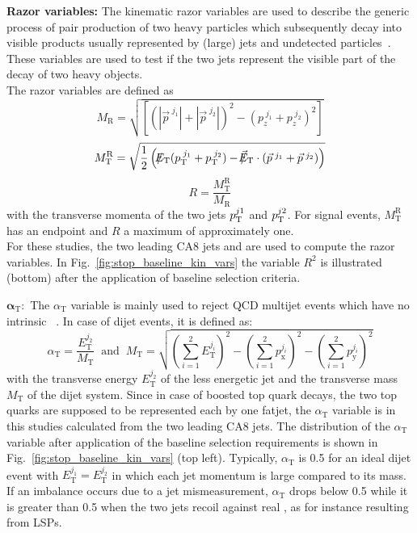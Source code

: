 \begin{description}
 \item \textbf{Razor variables:} The kinematic razor variables are used to describe the generic process of pair production of two heavy particles which subsequently decay into visible products usually represented by (large) jets and undetected particles~\cite{Chatrchyan:2012uea, Chatrchyan:2014goa, CMS-PAS-SUS-14-011}. These variables are used to test if the two jets represent the visible part of the decay of two heavy objects. \\
The razor variables are defined as
\begin{equation}
M_\mathrm{R} = \sqrt{\left[(|\vec{p}^{\; j_1} | + |\vec{p}^{\; j_2} |)^2 - (p_z^{\; j_1}  + p_z^{\; j_2} )^2 \right]}
\end{equation}
 \begin{equation}
M_\mathrm{T}^\mathrm{R} = \sqrt{\frac{1}{2} \left( \slash\mkern-12mu{E}_{\text{T}} (p_{\text{T}}^{\; j_1}  + p_{\text{T}}^{\; j_2} ) - \slash\mkern-12mu{\vec{E}}_{\text{T}} \cdot (\vec{p}^{\; j_1} + \vec{p}^{\; j_2}) \right) }
\end{equation}
\begin{equation}
R = \frac{M_\mathrm{T}^\mathrm{R}}{M_\mathrm{R}}
\end{equation}
with the transverse momenta of the two jets $p_{\text{T}}^{j1}$ and $p_{\text{T}}^{j2}$. For signal events, $M_\mathrm{T}^\mathrm{R}$ has an endpoint and $R$ a maximum of approximately one. \\
For these studies, the two leading CA8 jets and \met are used to compute the razor variables. In Fig.~\ref{fig:stop_baseline_kin_vars} the variable $R^2$ is illustrated (bottom) after the application of baseline selection criteria. 
\item $\mathbf{\alpha_\mathrm{T}:}$ The $\alpha_\mathrm{T}$ variable is mainly used to reject QCD multijet events which have no intrinsic \met~\cite{Chatrchyan:2012wa, Chatrchyan:2013lya}. In case of dijet events, it is defined as:
\begin{equation}
 \alpha_\mathrm{T} = \frac{E_\mathrm{T}^{j_2}}{M_\mathrm{T}} \;\; \mathrm{and} \;\; M_\mathrm{T} = \sqrt{\left( \sum_{i=1}^{2} E_\mathrm{T}^{j_i} \right)^2 - \left( \sum_{i=1}^{2} p_\mathrm{x}^{j_i} \right)^2 - \left( \sum_{i=1}^{2} p_\mathrm{y}^{j_i} \right)^2}
\end{equation}
with the transverse energy $E_\mathrm{T}^{j_2}$ of the less energetic jet and the transverse mass $M_\mathrm{T}$ of the dijet system. Since in case of boosted top quark decays, the two top quarks are supposed to be represented each by one fatjet, the $\alpha_\mathrm{T}$ variable is in this studies calculated from the two leading CA8 jets. The distribution of the $\alpha_\mathrm{T}$ variable after application of the baseline selection requirements is shown in Fig.~\ref{fig:stop_baseline_kin_vars} (top left). Typically, $\alpha_\mathrm{T}$ is 0.5 for an ideal dijet event with $E_\mathrm{T}^{j_1} = E_\mathrm{T}^{j_2}$ in which each jet momentum is large compared to its mass. If an imbalance occurs due to a jet mismeasurement, $\alpha_\mathrm{T}$ drops below 0.5 while it is greater than 0.5 when the two jets recoil against real \met, as for instance resulting from LSPs.
\end{description} 
